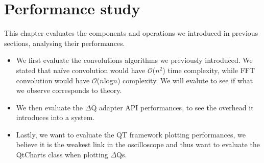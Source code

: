 \chapter{Performance study}
    This chapter evaluates the components and operations we introduced in previous sections, analysing their performances.
    \begin{itemize}
        \item We first evaluate the convolutions algorithms we previously introduced. We stated that naïve convolution would have $\mathcal{O}$($n^2$) time complexity, while FFT convolution would have $\mathcal{O}$($n$log$n$) complexity. We will evalute to see if what we observe corresponds to theory.
        \item We then evaluate the $\Delta$Q adapter API performances, to see the overhead it introduces into a system.
        \item Lastly, we want to evaluate the QT framework plotting performances, we believe it is the weakest link in the oscilloscope and thus want to evaluate the QtCharts class when plotting $\Delta$Qs. 
    \end{itemize}

    
     
    
